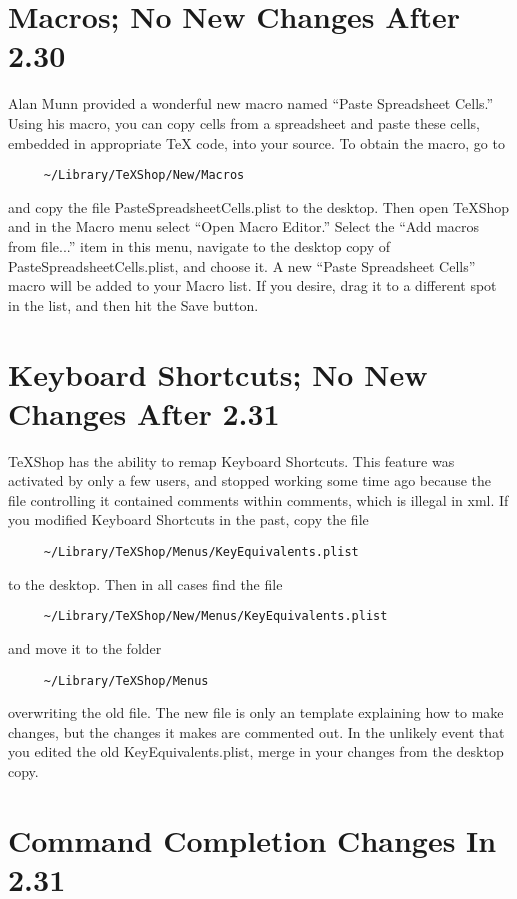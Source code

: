 \documentclass[11pt, oneside]{amsart}
\begin{document}
\section{Macros; No New Changes After 2.30}

Alan Munn provided a wonderful new macro named ``Paste Spreadsheet Cells.'' Using his macro, you can copy cells from a spreadsheet and paste these cells, embedded in appropriate TeX code, into your source. To obtain the macro, go to
\begin{verbatim}
     ~/Library/TeXShop/New/Macros
\end{verbatim}
and copy the file PasteSpreadsheetCells.plist to the desktop. Then open TeXShop and in the Macro menu select ``Open Macro Editor.'' Select the ``Add macros from file...'' item in this menu, navigate to the desktop copy of PasteSpreadsheetCells.plist, and choose it. A new ``Paste Spreadsheet Cells'' macro will be added to your Macro list. If you desire, drag it to a different spot in the list, and then hit the Save button.

\section{Keyboard Shortcuts; No New Changes After 2.31}

TeXShop has the ability to remap Keyboard Shortcuts. This feature was activated by only a few users, and stopped working some time ago because the file controlling it contained comments within comments, which is illegal in xml. If you modified Keyboard Shortcuts in the past, copy the file
\begin{verbatim}
     ~/Library/TeXShop/Menus/KeyEquivalents.plist
\end{verbatim}
 to  the desktop. Then in all cases find the file
\begin{verbatim}
     ~/Library/TeXShop/New/Menus/KeyEquivalents.plist
\end{verbatim}
and move it to the folder
\begin{verbatim}
     ~/Library/TeXShop/Menus
\end{verbatim}
overwriting the old file. The new file is only an template explaining how to make changes, but the changes it makes are commented out. In the unlikely event that you edited the old KeyEquivalents.plist, merge in your changes from the desktop copy.


\section{Command Completion Changes In 2.31}
\end{document}

